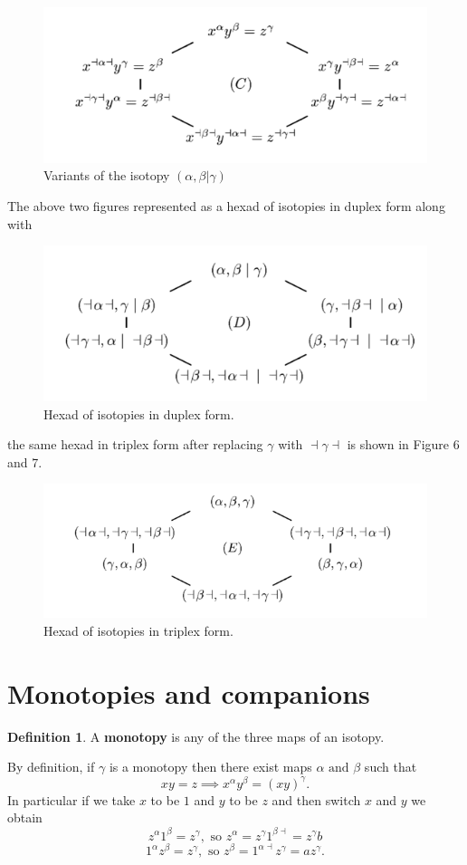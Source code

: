\documentclass[11pt]{report}
\theoremstyle{plain}
\theoremstyle{definition}
\newtheorem{defn}{Definition}
\begin{document}
\begin{figure}[h]
	\includegraphics[scale = 0.9]{onqando3}
	\centering
	\caption{Variants of the isotopy $ (\alpha, \beta | \gamma )$}
\end{figure}	
The above two figures represented as a hexad of isotopies in duplex form along with \begin{figure}[h]
	\includegraphics[scale = 0.9]{onqando4}
	\centering
	\caption{Hexad of isotopies in duplex form.}
\end{figure}	
	the same hexad in triplex form after replacing $ \gamma $ with $ \dashv \gamma \dashv $ is shown in Figure 6 and 7.
\begin{figure}[h]
	\includegraphics[scale = 0.9]{onqando5}
	\centering
	\caption{Hexad of isotopies in triplex form.}
\end{figure}
\section{Monotopies and companions}
\begin{defn}
	A \textbf{monotopy} is any of the three maps of an isotopy.
\end{defn}
By definition, if $ \gamma $ is a monotopy then there exist maps $ \alpha \text{ and } \beta $ such that $$ xy=z \implies x^\alpha y^\beta = (xy)^\gamma. $$ In particular if we take $ x $ to be $ 1 $ and $ y $ to be $ z $ and then switch $ x $ and $ y $ we obtain  
	$$z^\alpha 1^\beta = z^\gamma , \text{ so } z^\alpha  = z^\gamma 1^{\beta \dashv} = z^\gamma b  $$ 
	$$1^\alpha z^\beta =z^\gamma, \text{ so } z^\beta = 1^{\alpha \dashv}z^\gamma = a z^\gamma. $$
\end{document}
